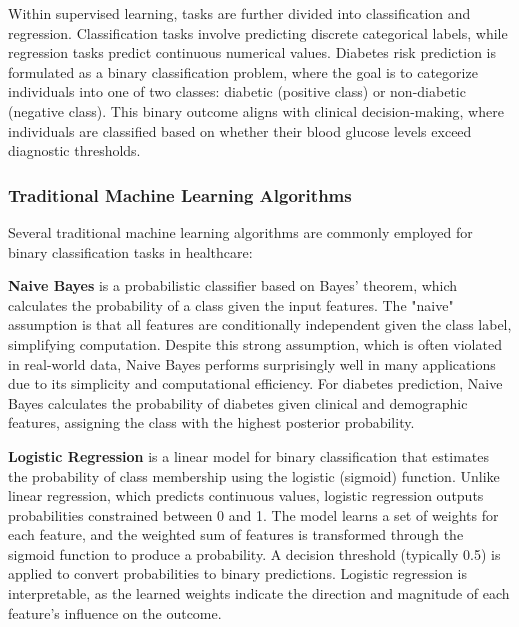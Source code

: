 Within supervised learning, tasks are further divided into classification and regression. Classification tasks involve predicting discrete categorical labels, while regression tasks predict continuous numerical values. Diabetes risk prediction is formulated as a binary classification problem, where the goal is to categorize individuals into one of two classes: diabetic (positive class) or non-diabetic (negative class). This binary outcome aligns with clinical decision-making, where individuals are classified based on whether their blood glucose levels exceed diagnostic thresholds.

\subsubsection{Traditional Machine Learning Algorithms}

Several traditional machine learning algorithms are commonly employed for binary classification tasks in healthcare:

\textbf{Naive Bayes} is a probabilistic classifier based on Bayes' theorem, which calculates the probability of a class given the input features. The "naive" assumption is that all features are conditionally independent given the class label, simplifying computation. Despite this strong assumption, which is often violated in real-world data, Naive Bayes performs surprisingly well in many applications due to its simplicity and computational efficiency. For diabetes prediction, Naive Bayes calculates the probability of diabetes given clinical and demographic features, assigning the class with the highest posterior probability.

\textbf{Logistic Regression} is a linear model for binary classification that estimates the probability of class membership using the logistic (sigmoid) function. Unlike linear regression, which predicts continuous values, logistic regression outputs probabilities constrained between 0 and 1. The model learns a set of weights for each feature, and the weighted sum of features is transformed through the sigmoid function to produce a probability. A decision threshold (typically 0.5) is applied to convert probabilities to binary predictions. Logistic regression is interpretable, as the learned weights indicate the direction and magnitude of each feature's influence on the outcome.



